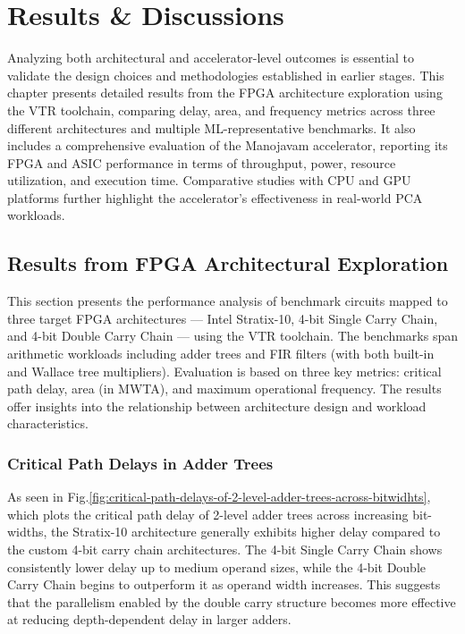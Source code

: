 \chapter{Results \& Discussions}

Analyzing both architectural and accelerator-level outcomes is essential to validate the design choices and methodologies established in earlier stages. This chapter presents detailed results from the FPGA architecture exploration using the VTR toolchain, comparing delay, area, and frequency metrics across three different architectures and multiple ML-representative benchmarks. It also includes a comprehensive evaluation of the Manojavam accelerator, reporting its FPGA and ASIC performance in terms of throughput, power, resource utilization, and execution time. Comparative studies with CPU and GPU platforms further highlight the accelerator's effectiveness in real-world PCA workloads.


\section{Results from FPGA Architectural Exploration}
This section presents the performance analysis of benchmark circuits mapped to three target FPGA architectures — Intel Stratix-10, 4-bit Single Carry Chain, and 4-bit Double Carry Chain — using the VTR toolchain. The benchmarks span arithmetic workloads including adder trees and FIR filters (with both built-in and Wallace tree multipliers). Evaluation is based on three key metrics: critical path delay, area (in MWTA), and maximum operational frequency. The results offer insights into the relationship between architecture design and workload characteristics.

\subsection{Critical Path Delays in Adder Trees}
As seen in Fig.\ref{fig:critical-path-delays-of-2-level-adder-trees-across-bitwidhts}, which plots the critical path delay of 2-level adder trees across increasing bit-widths, the Stratix-10 architecture generally exhibits higher delay compared to the custom 4-bit carry chain architectures. The 4-bit Single Carry Chain shows consistently lower delay up to medium operand sizes, while the 4-bit Double Carry Chain begins to outperform it as operand width increases. This suggests that the parallelism enabled by the double carry structure becomes more effective at reducing depth-dependent delay in larger adders.

